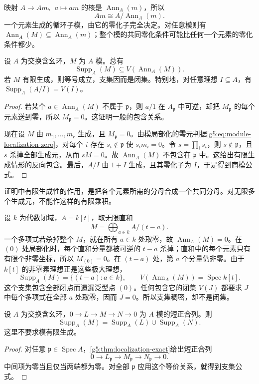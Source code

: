 映射 \(A\to Am\)、\(a\mapsto am\) 的核是 \(\operatorname{Ann}_A(m)\)，所以
\[
	Am\cong A/\operatorname{Ann}_A(m).
\]
一个元素生成的循环子模，由它的零化子完全决定。对任意模则有 \(\operatorname{Ann}_A(M)\subseteq\operatorname{Ann}_A(m)\)；整个模的共同零化条件可能比任何一个元素的零化条件都少。

\begin{proposition}\label{g5:prop:support-annihilator}
	设 \(A\) 为交换含幺环，\(M\) 为 \(A\) 模。总有
	\[
		\operatorname{Supp}_A(M)\subseteq V(\operatorname{Ann}_A(M)).
	\]
	若 \(M\) 有限生成，则等号成立，支集因而是闭集。特别地，对任意理想 \(I\subseteq A\)，有 \(\operatorname{Supp}_A(A/I)=V(I)\)。
\end{proposition}
\begin{proof}
	若某个 \(a\in\operatorname{Ann}_A(M)\) 不属于 \(\mathfrak p\)，则 \(a/1\) 在 \(A_{\mathfrak p}\) 中可逆，却把 \(M_{\mathfrak p}\) 的每个元素送到零，所以 \(M_{\mathfrak p}=0\)。这证明一般的包含关系。

	现在设 \(M\) 由 \(m_1,\ldots,m_r\) 生成，且 \(M_{\mathfrak p}=0\)。由模局部化的零元判据\eqref{g5:eq:module-localization-zero}，对每个 \(i\) 存在 \(s_i\notin\mathfrak p\) 使 \(s_im_i=0\)。令 \(s=\prod_i s_i\)，则 \(s\notin\mathfrak p\)，且 \(s\) 杀掉全部生成元，从而 \(sM=0\)。故 \(\operatorname{Ann}_A(M)\) 不包含在 \(\mathfrak p\) 中。这给出有限生成情形的反向包含。最后，\(A/I\) 由 \(1+I\) 生成，且其零化子为 \(I\)，于是得到商模公式。
\end{proof}

证明中有限生成性的作用，是把各个元素所需的分母合成一个共同分母。对无限多个生成元，不能作这样的有限乘积。

\begin{example}\label{g5:exm:nonclosed-module-support}
	设 \(k\) 为代数闭域，\(A=k[t]\)，取无限直和
	\[
		M=\bigoplus_{a\in k}A/(t-a).
	\]
	一个多项式若杀掉整个 \(M\)，就在所有 \(a\in k\) 处取零，故 \(\operatorname{Ann}_A(M)=0\)。在 \((0)\) 处局部化时，每个直和分量都被可逆的 \(t-a\) 杀掉；直和中的每个元素只有有限个非零坐标，所以 \(M_{(0)}=0\)。在 \((t-a)\) 处，第 \(a\) 个分量仍非零。由于 \(k[t]\) 的非零素理想正是这些极大理想，
	\[
		\operatorname{Supp}_A(M)=\{(t-a):a\in k\},
		\qquad V(\operatorname{Ann}_A(M))=\operatorname{Spec}k[t].
	\]
	这个支集包含全部闭点而遗漏泛型点 \((0)\)。任何包含它的闭集 \(V(J)\) 都要求 \(J\) 中每个多项式在全部 \(a\) 处取零，因而 \(J=0\)。所以支集稠密，却不是闭集。
\end{example}

\begin{proposition}\label{g5:prop:support-exact}
	设 \(A\) 为交换含幺环，\(0\to L\to M\to N\to0\) 为 \(A\) 模的短正合列。则
	\[
		\operatorname{Supp}_A(M)=\operatorname{Supp}_A(L)\cup\operatorname{Supp}_A(N).
	\]
	这里不要求模有限生成。
\end{proposition}
\begin{proof}
	对任意 \(\mathfrak p\in\operatorname{Spec}A\)，\cref{g5:thm:localization-exact}给出短正合列
	\[
		0\longrightarrow L_{\mathfrak p}\longrightarrow M_{\mathfrak p}
		\longrightarrow N_{\mathfrak p}\longrightarrow0.
	\]
	中间项为零当且仅当两端都为零。对全部 \(\mathfrak p\) 应用这个等价关系，就得到支集公式。
\end{proof}

